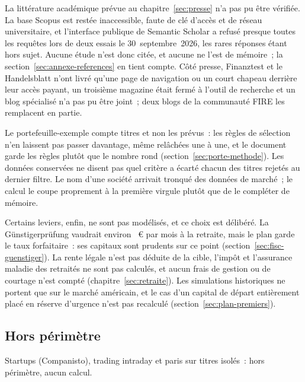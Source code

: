 La litt\'erature acad\'emique pr\'evue au chapitre~\ref{sec:presse} n'a pas pu \^etre v\'erifi\'ee. La
base Scopus est rest\'ee inaccessible, faute de cl\'e d'acc\`es et de r\'eseau universitaire, et
l'interface publique de Semantic Scholar a refus\'e presque toutes les requ\^etes lors de deux essais
le 30~septembre~2026, les rares r\'eponses \'etant hors sujet. Aucune \'etude n'est donc cit\'ee, et
aucune ne l'est de m\'emoire~; la section~\ref{sec:annexe-references} en tient compte. C\^ot\'e presse,
Finanztest et le Handelsblatt n'ont livr\'e qu'une page de navigation ou un court chapeau derri\`ere
leur acc\`es payant, un troisi\`eme magazine \'etait ferm\'e \`a l'outil de recherche et un blog
sp\'ecialis\'e n'a pas pu \^etre joint~; deux blogs de la communaut\'e FIRE les remplacent en partie.

Le portefeuille-exemple compte \NombreTitres{} titres et non les \NombreTitresVise{} pr\'evus~: les
r\`egles de s\'election n'en laissent pas passer davantage, m\^eme rel\^ach\'ees une \`a une, et le
document garde les r\`egles plut\^ot que le nombre rond (section~\ref{sec:porte-methode}). Les donn\'ees
conserv\'ees ne disent pas quel crit\`ere a \'ecart\'e chacun des \TitresEcartesFin{} titres rejet\'es
au dernier filtre. Le nom d'une soci\'et\'e arrivait tronqu\'e des donn\'ees de march\'e~; le calcul le
coupe proprement \`a la premi\`ere virgule plut\^ot que de le compl\'eter de m\'emoire.

Certains leviers, enfin, ne sont pas mod\'elis\'es, et ce choix est d\'elib\'er\'e. La
G\"unstigerpr\"ufung vaudrait environ \GuenstigerEconomieMois~€ par mois \`a la retraite, mais le plan
garde le taux forfaitaire~: ses capitaux sont prudents sur ce point
(section~\ref{sec:fisc-guenstiger}). La rente l\'egale n'est pas d\'eduite de la cible, l'imp\^ot et
l'assurance maladie des retrait\'es ne sont pas calcul\'es, et aucun frais de gestion ou de courtage
n'est compt\'e (chapitre~\ref{sec:retraite}). Les simulations historiques ne portent que sur le
march\'e am\'ericain, et le cas d'un capital de d\'epart enti\`erement plac\'e en r\'eserve d'urgence
n'est pas recalcul\'e (section~\ref{sec:plan-premiers}).

\subsection{Hors p\'erim\`etre}\label{sec:annexe-perimetre}

Startups (Companisto), trading intraday et paris sur titres isol\'es~: hors p\'erim\`etre, aucun calcul.

